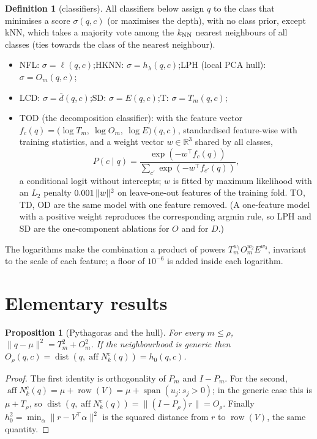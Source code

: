 \documentclass[10pt,a4paper]{article}
\theoremstyle{plain}
\newtheorem{proposition}[theorem]{Proposition}
\theoremstyle{definition}
\newtheorem{definition}[theorem]{Definition}
\theoremstyle{remark}
\newcommand{\R}{\mathbb{R}}
\newcommand{\Nk}{N_k^{c}(q)}
\newcommand{\aff}{\operatorname{aff}}
\newcommand{\dist}{\operatorname{dist}}
\newcommand{\meth}[1]{\textsf{#1}}
\newcommand{\kNN}{k_{\rm NN}}
\begin{document}
\begin{definition}[classifiers]\label{def:clf}\sloppy
All classifiers below assign $q$ to the class that minimises a score $\sigma(q,c)$ (or maximises the depth), with no class prior, except \meth{kNN}, which takes a majority vote among the $\kNN$ nearest neighbours of all classes (ties towards the class of the nearest neighbour).
\begin{itemize}[leftmargin=2em,itemsep=1pt]
\item \meth{NFL}: $\sigma=\ell(q,c)$;\quad \meth{HKNN}: $\sigma=h_\lambda(q,c)$;\quad \meth{LPH} (local PCA hull): $\sigma=O_m(q,c)$;
\item \meth{LCD}: $\sigma=\bar d(q,c)$;\quad \meth{SD}: $\sigma=E(q,c)$;\quad \meth{T}: $\sigma=T_m(q,c)$;
\item \meth{TOD} (the decomposition classifier): with the feature vector $f_c(q)=\big(\log T_m,\ \log O_m,\ \log E\big)(q,c)$, standardised feature-wise with training statistics, and a weight vector $w\in\R^3$ shared by all classes,
\[
P(c\mid q)=\frac{\exp(-w^{\top}f_c(q))}{\sum_{c'}\exp(-w^{\top}f_{c'}(q))},
\]
a conditional logit without intercepts; $w$ is fitted by maximum likelihood with an $L_2$ penalty $0.001\,\|w\|^2$ on leave-one-out features of the training fold. \meth{TO}, \meth{TD}, \meth{OD} are the same model with one feature removed. (A one-feature model with a positive weight reproduces the corresponding argmin rule, so \meth{LPH} and \meth{SD} are the one-component ablations for $O$ and for $D$.)
\end{itemize}
\end{definition}

The logarithms make the combination a product of powers $T_m^{w_1}O_m^{w_2}E^{w_3}$, invariant to the scale of each feature; a floor of $10^{-6}$ is added inside each logarithm.

\section{Elementary results}\label{sec:theory}

\begin{proposition}[Pythagoras and the hull]\label{prop:pyth}
For every $m\le\rho$, $\|q-\mu\|^2=T_m^2+O_m^2$. If the neighbourhood is generic then $O_\rho(q,c)=\dist(q,\aff\Nk)=h_0(q,c)$.
\end{proposition}
\begin{proof}
The first identity is orthogonality of $P_m$ and $I-P_m$. For the second, $\aff\Nk=\mu+\operatorname{row}(V)=\mu+\operatorname{span}(u_j:s_j>0)$; in the generic case this is $\mu+T_\rho$, so $\dist(q,\aff\Nk)=\|(I-P_\rho)r\|=O_\rho$. Finally $h_0^2=\min_\alpha\|r-V^{\top}\alpha\|^2$ is the squared distance from $r$ to $\operatorname{row}(V)$, the same quantity.
\end{proof}
\end{document}
